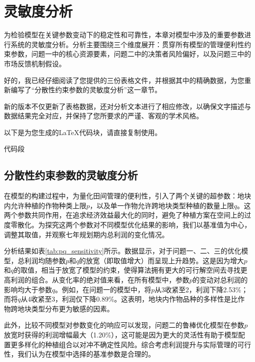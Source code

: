 \section{灵敏度分析}

为检验模型在关键参数变动下的稳定性和可靠性，本章对模型中涉及的重要参数进行系统的灵敏度分析。分析主要围绕三个维度展开：贯穿所有模型的管理便利性约束参数，问题一中的核心资源要素，问题二中的决策者风险偏好，以及问题三中的市场反馈机制假设。

好的，我已经仔细阅读了您提供的三份表格文件，并根据其中的精确数据，为您重新编写了“分散性约束参数的灵敏度分析”这一章节。

新的版本不仅更新了表格数据，还对分析文本进行了相应修改，以确保文字描述与数据结果完全对应，并保持了您所要求的严谨、客观的学术风格。

以下是为您生成的LaTeX代码块，请直接复制使用。

代码段

\subsection{分散性约束参数的灵敏度分析}

在模型的构建过程中，为量化田间管理的便利性，引入了两个关键的超参数：地块内允许种植的作物种类上限$p$，以及单一作物允许跨地块类型种植的数量上限$q$。这两个参数共同作用，在追求经济效益最大化的同时，避免了种植方案在空间上的过度零散化。为探究这两个参数对不同模型优化结果的影响，我们以基准值为中心，调整其取值，并观察七年规划期内总利润的变化情况。

分析结果如表\ref{tab:pq_sensitivity}所示。数据显示，对于问题一、二、三的优化模型，总利润均随参数$p$和$q$的放宽（即取值增大）而呈现上升趋势。这是因为增大$p$和$q$的取值，相当于放宽了模型的约束，使得算法拥有更大的可行解空间去寻找更高利润的组合。从变化率的绝对值来看，在所有模型中，参数$p$的变动对总利润的影响均大于参数$q$。例如，在问题一的模型中，将$p$从3收紧至2，利润下降2.53\%；而将$q$从4收紧至3，利润仅下降0.89\%。这表明，地块内作物品种的多样性是比作物跨地块类型分布更为敏感的因素。

此外，比较不同模型对参数变化的响应可以发现，问题二的鲁棒优化模型在参数$p$放宽时获得的利润增幅最大（1.20\%），这可能是因为更大的灵活性有助于模型配置更多样化的种植组合以对冲不确定性风险。综合考虑利润提升与实际管理的可行性，我们认为在模型中选择的基准参数是合理的。

